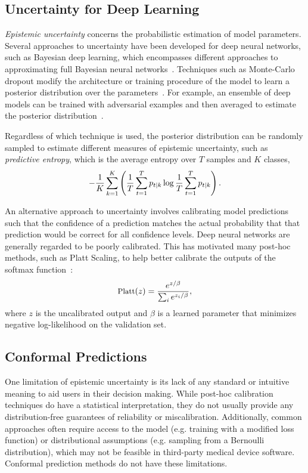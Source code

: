 \documentclass[letterpaper]{article} %
\begin{document}
\subsection{Uncertainty for Deep Learning}
\textit{Epistemic uncertainty} concerns the probabilistic estimation of model parameters.
Several approaches to uncertainty have been developed for deep neural networks, such as Bayesian deep learning, which encompasses different approaches to approximating full Bayesian neural networks~\cite{Gal2016Uncertainty}.
Techniques such as Monte-Carlo dropout modify the architecture or training procedure of the model to learn a posterior distribution over the parameters~\cite{pmlr-v48-gal16}.
For example, an ensemble of deep models can be trained with adversarial examples and then averaged to estimate the posterior distribution~\cite{NIPS2017_9ef2ed4b}.

Regardless of which technique is used, the posterior distribution can be randomly sampled to estimate different measures of epistemic uncertainty, such as \textit{predictive entropy}, which is the average entropy over $T$ samples and $K$ classes,
\begin{equation}
\label{eq:entropy}
\small
-\frac{1}{K} \sum_{k=1}^K \left(\frac{1}{T} \sum_{t=1}^T p_{t \mid k} \log \frac{1}{T} \sum_{t=1}^T p_{t \mid k}\right).
\end{equation}


An alternative approach to uncertainty involves calibrating model predictions such that the confidence of a prediction matches the actual probability that that prediction would be correct for all confidence levels.
Deep neural networks are generally regarded to be poorly calibrated.
This has motivated many post-hoc methods, such as Platt Scaling, to help better calibrate the outputs of the softmax function~\cite{pmlr-v70-guo17a}:
\begin{equation}
\label{eq:platt}
\small
\textrm{Platt}(z) = \frac{e^{z/\beta}}{\sum_i e^{z_i/\beta}},
\end{equation}
where $z$ is the uncalibrated output and $\beta$ is a learned parameter that minimizes negative log-likelihood on the validation set.

\subsection{Conformal Predictions}

One limitation of epistemic uncertainty is its lack of any standard or intuitive meaning to aid users in their decision making.
While post-hoc calibration techniques do have a statistical interpretation, they do not usually provide any distribution-free guarantees of reliability or miscalibration.
Additionally, common approaches often require access to the model (e.g. training with a modified loss function) or distributional assumptions (e.g. sampling from a Bernoulli distribution), which may not be feasible in third-party medical device software.
Conformal prediction methods do not have these limitations.
\end{document}
